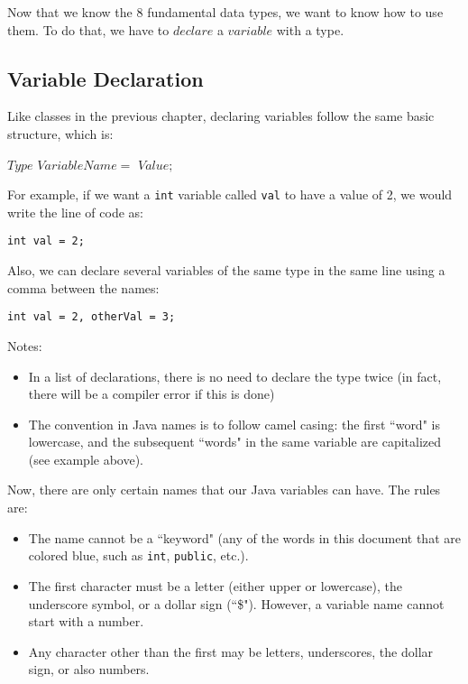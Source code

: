 \noindent Now that we know the 8 fundamental data types, we want to know how to use them. To do that, we have to $declare$ a $variable$ with a type.

\subsection{Variable Declaration}
Like classes in the previous chapter, declaring variables follow the same basic structure, which is:
\begin{center}
$Type$ $VariableName = $ $Value;$
\end{center}

\noindent For example, if we want a \verb|int| variable called \verb|val| to have a value of 2, we would write the line of code as:

\begin{lstlisting}
int val = 2;
\end{lstlisting}

\noindent Also, we can declare several variables of the same type in the same line using a comma between the names:
\begin{lstlisting}
int val = 2, otherVal = 3;
\end{lstlisting}
Notes: 
\begin{itemize}
\item In a list of declarations, there is no need to declare the type twice (in fact, there will be a compiler error if this is done)
\item The convention in Java names is to follow camel casing: the first ``word" is lowercase, and the subsequent ``words" in the same variable are capitalized (see example above).
\end{itemize}

\noindent Now, there are only certain names that our Java variables can have. The rules are:
\begin{itemize}
\item The name cannot be a ``keyword" (any of the words in this document that are colored blue, such as \verb|int|, \verb|public|, etc.).
\item The first character must be a letter (either upper or lowercase), the underscore symbol, or a dollar sign (``\$"). However, a variable name cannot start with a number. 
\item Any character other than the first may be letters, underscores, the dollar sign, or also numbers. 
\end{itemize}

